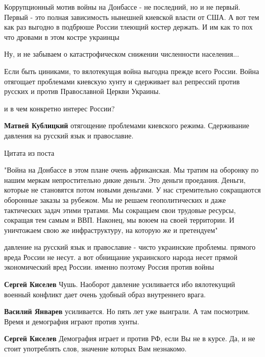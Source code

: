 \begin{itemize}

Коррупционный мотив войны на Донбассе - не последний, но и не первый. Первый -
это полная зависимость нынешней киевской власти от США. А вот тем как раз
выгодно в подбрюше России тлеющий костер держать. И им как то пох что дровами в
этом костре украинцы

Ну, и не забываем о катастрофическом снижении численности населения...


Если быть циниками, то вялотекущая война выгодна прежде всего России.  Война
отягощает проблемами киевскую хунту и сдерживает вал репрессий против русских и
против Православной Церкви Украины.

\begin{itemize} %
и в чем конкретно интерес России?

\textbf{Матвей Кублицкий} отягощение проблемами киевского режима. Сдерживание давления на русский язык и православие.


Цитата из поста

"Война на Донбассе в этом плане очень африканская. Мы тратим на оборонку по
нашим меркам непростительно дикие деньги. Это деньги проедания. Деньги, которые
не становятся потом новыми деньгами. У нас стремительно сокращаются оборонные
заказы за рубежом. Мы не решаем геополитических и даже тактических задач этими
тратами. Мы сокращаем свои трудовые ресурсы, сокращая тем самым и ВВП. Наконец,
мы воюем на своей территории. И уничтожаем свою же инфраструктуру, на которую
же и претендуем"


давление на русский язык и православие - чисто украинские проблемы. прямого
вреда России не несут. а вот обнищание украинского народа несет прямой
экономический вред России. именно поэтому Россия против войны

\textbf{Сергей Киселев} Чушь. Наоборот давление усиливается ибо вялотекущий военный конфликт дает очень удобный образ внутреннего врага.

\textbf{Василий Январев} усиливается. Но пять лет уже выиграли. А там посмотрим. Время и демография играют против хунты.

\textbf{Сергей Киселев} Демография играет и против РФ, если Вы не в курсе. Да, и не стоит употреблять слов, значение которых Вам незнакомо.


\end{itemize}
\end{itemize}
